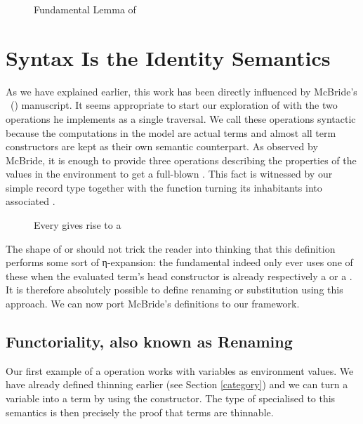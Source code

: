 \begin{figure}[h]
\caption{Fundamental Lemma of \label{fig:fundsem}}
\end{figure}

\section{Syntax Is the Identity Semantics}
\label{sec:syntactic}

As we have explained earlier, this work has been directly influenced by
McBride's ~(\citeyear{mcbride2005type}) manuscript. It seems appropriate
to start our exploration of  with the two operations he
implements as a single traversal. We call these operations syntactic
because the computations in the model are actual terms and almost all term
constructors are kept as their own semantic counterpart. As observed by
McBride, it is enough to provide three operations describing the properties
of the values in the environment to get a full-blown . This
fact is witnessed by our simple  record type together with
the  function turning its inhabitants into associated
.

\begin{figure}[h]
\caption{Every  gives rise to a \label{fig:syntactic}}
\end{figure}

The shape of  or  should not trick the reader
into thinking that this definition performs some sort of η-expansion:
the fundamental  indeed only ever uses one of these when the
evaluated term's head constructor is already respectively a 
or a . It is therefore absolutely possible to define renaming
or substitution using this approach. We can now port McBride's definitions
to our framework.


\subsection{Functoriality, also known as Renaming}

Our first example of a  operation works with variables as
environment values. We have already defined thinning earlier (see
Section \ref{category}) and we can turn a variable into a term by using
the  constructor. The type of  specialised to this
semantics is then precisely the proof that terms are thinnable.

